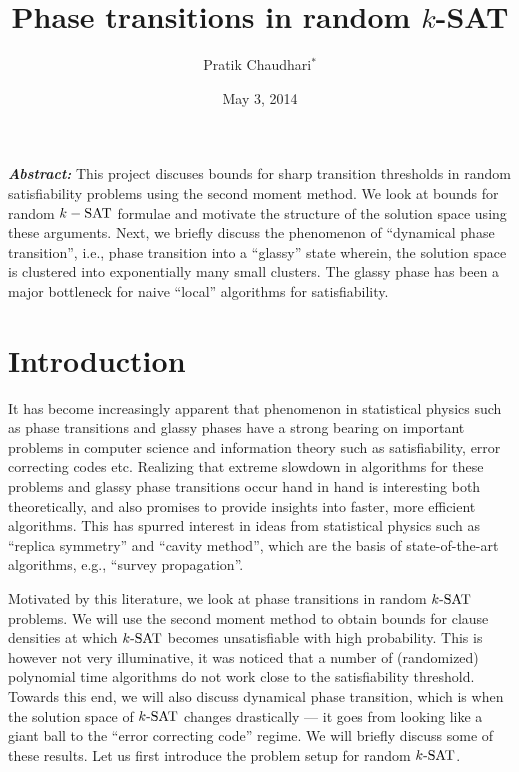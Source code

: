 \documentclass[letterpaper, 10pt, twocolumn, reqno]{amsart}
\title{Phase transitions in random $k$-SAT}
\author{Pratik Chaudhari$^*$}
\date{May 3, 2014}
\begin{document}
\maketitle
{\small
\textbf{\emph{Abstract:}}
This project discuses bounds for sharp transition thresholds in random satisfiability problems using the second moment method. We look at bounds for random $k-\textrm{SAT}$ formulae and motivate the structure of the solution space using these arguments. Next, we briefly discuss the phenomenon of ``dynamical phase transition'', i.e., phase transition into a ``glassy'' state wherein, the solution space is clustered into exponentially many small clusters. The glassy phase has been a major bottleneck for naive ``local'' algorithms for satisfiability.
}

\section{Introduction}
\label{sec:intro}
It has become increasingly apparent that phenomenon in statistical physics such as phase transitions and glassy phases have a strong bearing on important problems in computer science and information theory such as satisfiability, error correcting codes etc. Realizing that extreme slowdown in algorithms for these problems and glassy phase transitions occur hand in hand is interesting both theoretically, and also promises to provide insights into faster, more efficient algorithms. This has spurred interest in ideas from statistical physics such as ``replica symmetry'' and ``cavity method'', which are the basis of state-of-the-art algorithms, e.g., ``survey propagation''.


Motivated by this literature, we look at phase transitions in random $k\textrm{-SAT}$ problems. We will use the second moment method to obtain bounds for clause
densities at which $k\textrm{-SAT}$ becomes unsatisfiable with high probability. This is however not very illuminative, it was noticed that a number of (randomized)
polynomial time algorithms do not work close to the satisfiability threshold. Towards this end, we will also discuss dynamical phase transition, which is
when the solution space of $k\textrm{-SAT}$ changes drastically --- it goes from looking like a giant ball to the ``error correcting code'' regime. We will
briefly discuss some of these results. Let us first introduce the problem setup for random $k\textrm{-SAT}$.
\end{document}

